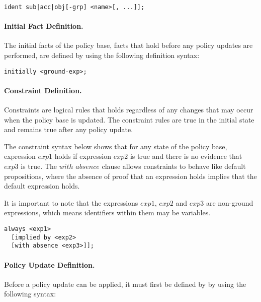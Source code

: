 \documentclass[10pt, twocolumn]{article}
\begin{document}
          \begin{verbatim}ident sub|acc|obj[-grp] <name>[, ...]];\end{verbatim}

        \paragraph{Initial Fact Definition.}

          The initial facts of the policy base, facts that hold before any
          policy updates are performed, are defined by using the following
          definition syntax:

          \begin{verbatim}initially <ground-exp>;\end{verbatim}

        \paragraph{Constraint Definition.}

          Constraints are logical rules that holds regardless of any changes
          that may occur when the policy base is updated. The constraint rules
          are true in the initial state and remains true after any policy
          update.

          The constraint syntax below shows that for any state of the policy
          base, expression $exp1$ holds if expression $exp2$ is true and there
          is no evidence that $exp3$ is true. The $with$ $absence$ clause
          allows constraints to behave like default propositions, where the
          absence of proof that an expression holds implies that the default
          expression holds.

          It is important to note that the expressions $exp1$, $exp2$ and
          $exp3$ are non-ground expressions, which means identifiers within
          them may be variables.

          \begin{verbatim}
always <exp1>
  [implied by <exp2>
  [with absence <exp3>]];
          \end{verbatim}

        \paragraph{Policy Update Definition.}

          Before a policy update can be applied, it must first be defined by
          by using the following syntax:
\end{document}
